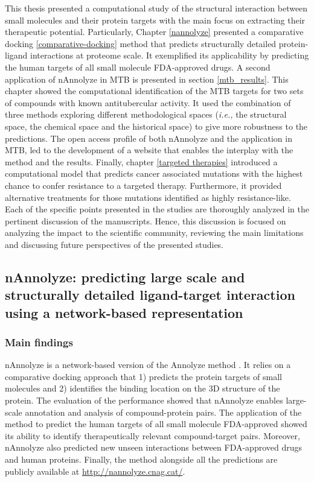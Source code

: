 \documentclass[11pt, b5paper,twoside]{tesi_upf}
\begin{document}
\par This thesis presented a computational study of the structural interaction between small molecules and their protein targets with the main focus on extracting their therapeutic potential. Particularly, Chapter \ref{nannolyze} presented a comparative docking \ref{comparative-docking} method that predicts structurally detailed protein-ligand interactions at proteome scale. It exemplified its applicability by predicting the human targets of all small molecule FDA-approved drugs. A second application of nAnnolyze in MTB is presented in section \ref{mtb_results}. This chapter showed the computational identification of the MTB targets for two sets of compounds with known antitubercular activity. It used the combination of three methods exploring different methodological spaces (\textit{i.e.,} the structural space, the chemical space and the historical space) to give more robustness to the predictions. The open access profile of both nAnnolyze and the application in MTB, led to the development of a website that enables the interplay with the method and the results. Finally, chapter \ref{targeted therapies} introduced a computational model that predicts cancer associated mutations with the highest chance to confer resistance to a targeted therapy. Furthermore, it provided alternative treatments for those mutations identified as highly resistance-like. Each of the specific points presented in the studies are thoroughly analyzed in the pertinent discussion of the manuscripts. Hence, this discussion is focused on analyzing the impact to the scientific community, reviewing the main limitations and discussing future perspectives of the presented studies.

 \subsection{nAnnolyze: predicting large scale and structurally detailed ligand-target interaction using a network-based representation}
 
 \subsubsection{Main findings}
 \par nAnnolyze is a network-based version of the Annolyze method \cite{Marti-Renom2007}. It relies on a comparative docking approach that 1) predicts the protein targets of small molecules and 2) identifies the binding location on the 3D structure of the protein. The evaluation of the performance showed that nAnnolyze enables large-scale annotation and analysis of compound-protein pairs. The application of the method to predict the human targets of all small molecule FDA-approved showed its ability to identify therapeutically relevant compound-target pairs. Moreover, nAnnolyze also predicted new unseen interactions between FDA-approved drugs and human proteins. Finally, the method alongside all the predictions are publicly available at \url{http://nannolyze.cnag.cat/}.
\end{document}
